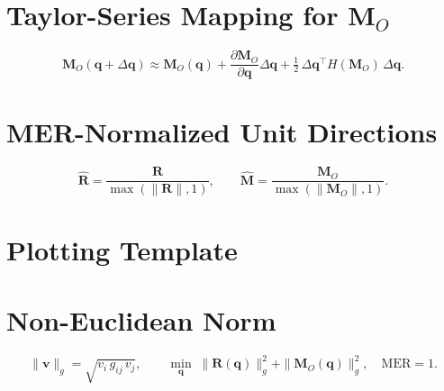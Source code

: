 \documentclass[12pt]{article}
\newcommand{\MER}{1}
\begin{document}
\section*{Taylor-Series Mapping for \(\mathbf{M}_O\)}
\[
\mathbf{M}_O(\mathbf{q}+\Delta\mathbf{q})
\approx
\mathbf{M}_O(\mathbf{q})
+
\frac{\partial \mathbf{M}_O}{\partial \mathbf{q}}\Delta\mathbf{q}
+
\tfrac12\,\Delta\mathbf{q}^\top H(\mathbf{M}_O)\,\Delta\mathbf{q}.
\]

\section*{MER-Normalized Unit Directions}
\[
\hat{\mathbf{R}}=\frac{\mathbf{R}}{\max(\|\mathbf{R}\|,\MER)},\qquad
\hat{\mathbf{M}}=\frac{\mathbf{M}_O}{\max(\|\mathbf{M}_O\|,\MER)}.
\]

\section*{Plotting Template}
\begin{center}
\end{center}

\section*{Non-Euclidean Norm}
\[
\|\mathbf{v}\|_g=\sqrt{v_i\,g_{ij}\,v_j},\qquad
\min_{\mathbf{q}}\;\|\mathbf{R}(\mathbf{q})\|_g^2+\|\mathbf{M}_O(\mathbf{q})\|_g^2,\quad \mathrm{MER}=\MER.
\]
\end{document}
